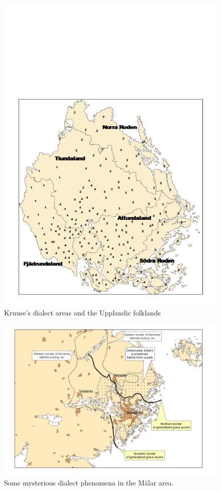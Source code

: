  

\begin{figure}[h]
\includegraphics[height=.5\textheight]{figures/45_Kruuse}
\caption{Kruuse’s dialect areas and the Upplandic folklands}
\label{map:40}
\end{figure}

 
\begin{figure}[h]
\includegraphics[height=.5\textheight]{figures/46_Mysterious}
\caption{Some mysterious dialect phenomena in the Mälar area.}
\label{map:41}
\end{figure}

 